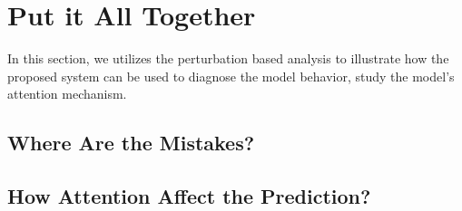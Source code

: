 \section{Put it All Together}
In this section, we utilizes the perturbation based analysis
to illustrate how the proposed system can be used
to diagnose the model behavior, study the model's attention mechanism.

\subsection{Where Are the Mistakes?}


\subsection{How Attention Affect the Prediction?}


